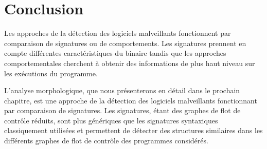 \section{Conclusion}
Les approches de la détection des logiciels malveillants fonctionnent par comparaison de signatures ou de comportements.
Les signatures prennent en compte différentes caractéristiques du binaire tandis que les approches comportementales cherchent à obtenir des informations de plus haut niveau sur les exécutions du programme.

L'analyse morphologique, que nous présenterons en détail dans le prochain chapitre, est une approche de la détection des logiciels malveillants fonctionnant par comparaison de signatures.
Les signatures, étant des graphes de flot de contrôle réduits, sont plus génériques que les signatures syntaxiques classiquement utilisées et permettent de détecter des structures similaires dans les différents graphes de flot de contrôle des programmes considérés.